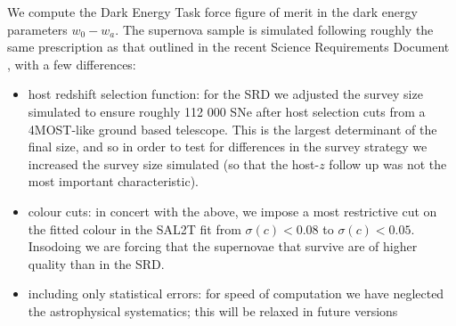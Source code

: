 \documentclass[a4paper,10pt]{article}
\begin{document}
We compute the Dark Energy Task force figure of merit in the dark energy parameters $w_0-w_a.$
The supernova sample is simulated following roughly the same prescription as that outlined in the recent Science Requirements Document \cite{descsrd}, with a few differences:
\begin{itemize}
\item host redshift selection function: for the SRD we adjusted the survey size simulated to ensure roughly 112 000 SNe after host selection cuts from a 4MOST-like ground based telescope. This is the largest determinant of the final size, and so in order to test for differences in the survey strategy we increased the survey size simulated (so that the host-$z$ follow up was not the most important characteristic).
\item colour cuts: in concert with the above, we impose a most restrictive cut on the fitted colour in the SAL2T fit from $\sigma(c) < 0.08$ to $\sigma(c) < 0.05.$ Insodoing we are forcing that the supernovae that survive are of higher quality than in the SRD.
\item including only statistical errors: for speed of computation we have neglected the astrophysical systematics; this will be relaxed in future versions
\end{itemize}
\end{document}
